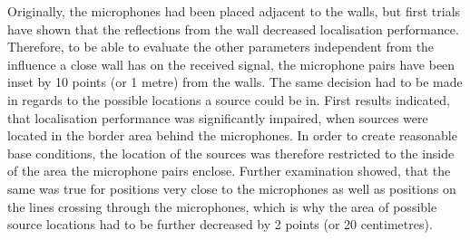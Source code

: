 Originally, the microphones had been placed adjacent to the walls, but first trials have shown that the reflections from the wall decreased localisation performance. Therefore, to be able to evaluate the other parameters independent from the influence a close wall has on the received signal, the microphone pairs have been inset by 10 points (or 1 metre) from the walls. The same decision had to be made in regards to the possible locations a source could be in. First results indicated, that localisation performance was significantly impaired, when sources were located in the border area behind the microphones. In order to create reasonable base conditions, the location of the sources was therefore restricted to the inside of the area the microphone pairs enclose. Further examination showed, that the same was true for positions very close to the microphones as well as positions on the lines crossing through the microphones, which is why the area of possible source locations had to be further decreased by 2 points (or 20 centimetres).

